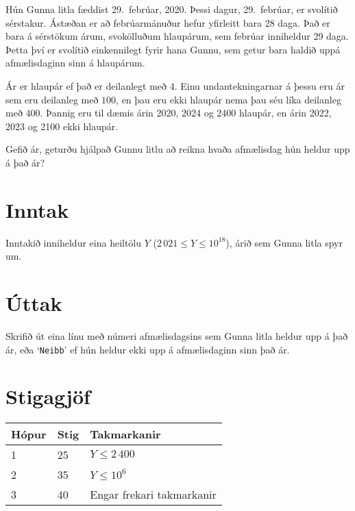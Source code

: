 
Hún Gunna litla fæddist 29.\ febrúar, 2020. Þessi dagur, 29.\ febrúar, er
svolítið sérstakur. Ástæðan er að febrúarmánuður hefur yfirleitt bara 28 daga.
Það er bara á sérstökum árum, svokölluðum hlaupárum, sem febrúar inniheldur 29
daga. Þetta því er svolítið einkennilegt fyrir hana Gunnu, sem getur bara
haldið uppá afmælisdaginn sinn á hlaupárum.

Ár er hlaupár ef það er deilanlegt með $4$. Einu undantekningarnar á þessu eru
ár sem eru deilanleg með $100$, en þau eru ekki hlaupár nema þau séu líka
deilanleg með $400$. Þannig eru til dæmis árin 2020, 2024 og 2400 hlaupár, en
árin 2022, 2023 og 2100 ekki hlaupár.

Gefið ár, geturðu hjálpað Gunnu litlu að reikna hvaða afmælisdag hún heldur upp
á það ár?

\section*{Inntak}
Inntakið inniheldur eina heiltölu $Y$ ($2\,021\leq Y\leq 10^{18}$), árið sem
Gunna litla spyr um.

\section*{Úttak}
Skrifið út eina línu með númeri afmælisdagsins sem Gunna litla heldur upp á það
ár, eða `\texttt{Neibb}' ef hún heldur ekki upp á afmælisdaginn sinn það ár.

\section*{Stigagjöf}
\begin{tabular}{|l|l|l|}
\hline
Hópur & Stig & Takmarkanir \\ \hline
1     & 25   & $Y \leq 2\,400$ \\ \hline
2     & 35   & $Y \leq 10^6$ \\ \hline
3     & 40   & Engar frekari takmarkanir\\ \hline
\end{tabular}

